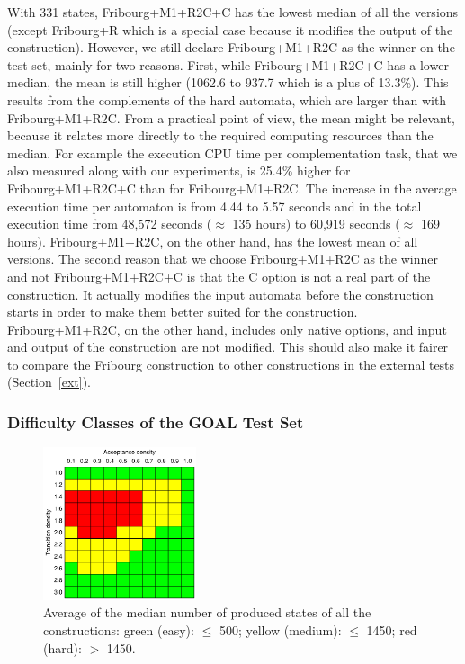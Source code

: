 With 331 states, Fribourg+M1+R2C+C has the lowest median of all the versions (except Fribourg+R which is a special case because it modifies the output of the construction). However, we still declare Fribourg+M1+R2C as the winner on the \goal{} test set, mainly for two reasons. First, while Fribourg+M1+R2C+C has a lower median, the mean is still higher (1062.6 to 937.7 which is a plus of 13.3\%). This results from the complements of the hard automata, which are larger than with Fribourg+M1+R2C. From a practical point of view, the mean might be relevant, because it relates more directly to the required computing resources than the median. For example the execution CPU time per complementation task, that we also measured along with our experiments, is 25.4\% higher for Fribourg+M1+R2C+C than for Fribourg+M1+R2C. The increase in the average execution time per automaton is from 4.44 to 5.57 seconds and in the total execution time from 48,572 seconds ($\approx$ 135 hours) to 60,919 seconds ($\approx$ 169 hours). Fribourg+M1+R2C, on the other hand, has the lowest mean of all versions. The second reason that we choose Fribourg+M1+R2C as the winner and not Fribourg+M1+R2C+C is that the C option is not a real part of the construction. It actually modifies the input automata before the construction starts in order to make them better suited for the construction. Fribourg+M1+R2C, on the other hand, includes only native options, and input and output of the construction are not modified. This should also make it fairer to compare the Fribourg construction to other constructions in the external tests (Section~\ref{ext}).

\subsubsection{Difficulty Classes of the GOAL Test Set}

\begin{figure}[ht]
\centering
\includegraphics[width=0.4\textwidth]{figures/r/internal/goal/s.median.image.pdf}
\caption{Average of the median number of produced states of all the constructions: green (easy): $\leq$ 500; yellow (medium): $\leq$ 1450; red (hard): $>$ 1450.}
\end{figure}



